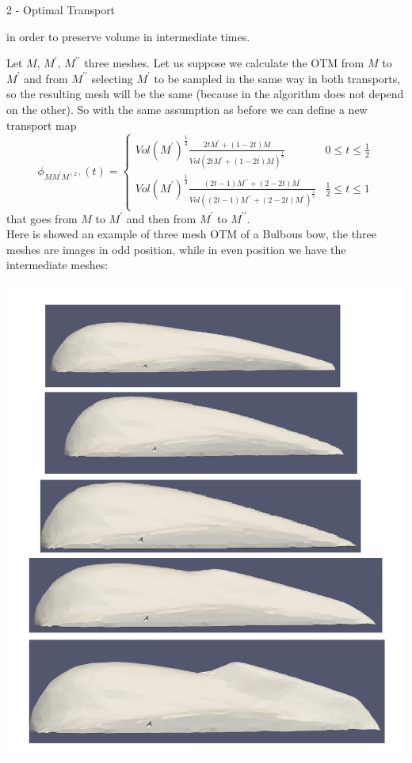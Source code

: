 \documentclass[b0paper,portrait]{baposter}
\begin{document}
\begin{poster}
\begin{posterbox}[name=otm,below=introduction,span=6,column=0]{2
    - Optimal Transport }
\begin{minipage}{0.48\textwidth}
in order to preserve volume in intermediate times.\\
\end{minipage}
\hspace{.2cm}
\begin{minipage}{0.46\textwidth}
Let $M$, $M^{\prime}$, $M^{\prime\prime}$ three meshes. Let us suppose we calculate the OTM from $M$ to $M^{\prime}$ and from $M^{\prime\prime}$ selecting  $M^{\prime}$ to be sampled in the same way in both transports, so the resulting mesh will be the same (because in the algorithm does not depend on the other).  
So with the same assumption as before we can define a new transport map $$\phi_{MM^{\prime}M^{(2)}}(t)=\begin{cases}
Vol(M^{\prime})^{\frac{1}{3}}\frac{2tM^{\prime}+(1-2t)M}{Vol(2tM^{\prime}+(1-2t)M)^{\frac{1}{3}}} & 0 \le t \le \frac{1}{2} \\
Vol(M^{\prime})^{\frac{1}{3}}\frac{(2t-1)M^{\prime\prime}+(2-2t)M^{\prime}}{Vol((2t-1)M^{\prime\prime}+(2-2t)M^{\prime})^{\frac{1}{3}}} & \frac{1}{2} \le t \le 1
\end{cases}$$
that goes from $M$ to $M^{\prime}$ and then from $M^{\prime}$ to $M^{\prime\prime}$.  \\
Here is showed an example of three mesh OTM of a Bulbous bow, the three meshes are images in odd position, while in even position we have the intermediate meshes:
\begin{center}
\includegraphics[scale=0.3]{otm2} 
\end{center}
\end{minipage}
\end{posterbox}


\end{poster}
\end{document}
